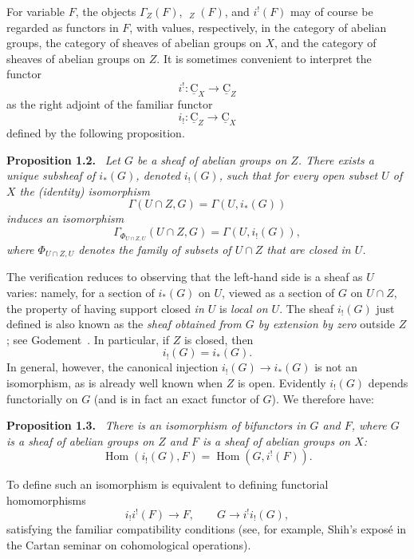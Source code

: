 \documentclass[11pt,a4paper,oneside]{book}
\providecommand{\srcpage}[1]{%
  \marginpar{\raggedright\scriptsize\color{gray}Original French p.~#1}}
\providecommand{\uC}{\underline{\mathrm C}}
\providecommand{\uGamma}{\mathop{\underline{\Gamma}}\nolimits}
\newenvironment{sgastatement}[1]
  {\par\addvspace{0.8\baselineskip}\noindent\textbf{#1.}\ \itshape}
  {\par\addvspace{0.35\baselineskip}}
\theoremstyle{plain}
\theoremstyle{definition}
\theoremstyle{remark}
\begin{document}
For variable $F$, the objects $\Gamma_Z(F)$, $\uGamma_Z(F)$, and
$i^!(F)$ may of course be regarded as functors in $F$, with values,
respectively, in the category of abelian groups, the category of sheaves
of abelian groups on $X$, and the category of sheaves of abelian groups
on $Z$.  It is sometimes convenient to interpret the functor
\[
  i^!: \uC_X\longrightarrow\uC_Z
\]
as the right adjoint of the familiar functor
\[
  i_!: \uC_Z\longrightarrow\uC_X
\]
defined by the following proposition.

\srcpage{9}
\begin{sgastatement}{Proposition 1.2}
Let $G$ be a sheaf of abelian groups on $Z$.  There exists a unique
subsheaf of $i_*(G)$, denoted $i_!(G)$, such that for every open subset
$U$ of $X$ the (identity) isomorphism
\[
  \Gamma(U\cap Z,G)=\Gamma(U,i_*(G))
\]
induces an isomorphism
\[
  \Gamma_{\Phi_{U\cap Z,U}}(U\cap Z,G)=\Gamma(U,i_!(G)),
\]
where $\Phi_{U\cap Z,U}$ denotes the family of subsets of $U\cap Z$
that are closed in $U$.
\end{sgastatement}

The verification reduces to observing that the left-hand side is a
sheaf as $U$ varies: namely, for a section of $i_*(G)$ on $U$, viewed
as a section of $G$ on $U\cap Z$, the property of having support closed
\emph{in $U$} is \emph{local on $U$}.  The sheaf $i_!(G)$ just defined
is also known as the \emph{sheaf obtained from $G$ by extension by zero}
outside $Z$; see Godement~\cite{Godement}.  In particular, if $Z$ is
closed, then
\begin{equation}
  i_!(G)=i_*(G).
  \tag{9}\label{eq:I.9}
\end{equation}
In general, however, the canonical injection
$i_!(G)\to i_*(G)$ is not an isomorphism, as is already well known when
$Z$ is open.  Evidently $i_!(G)$ depends functorially on $G$ (and is in
fact an exact functor of $G$).  We therefore have:

\begin{sgastatement}{Proposition 1.3}
There is an isomorphism of bifunctors in $G$ and $F$, where $G$ is a
sheaf of abelian groups on $Z$ and $F$ is a sheaf of abelian groups on
$X$:
\begin{equation}
  \operatorname{Hom}(i_!(G),F)
  =\operatorname{Hom}(G,i^!(F)).
  \tag{10}\label{eq:I.10}
\end{equation}
\end{sgastatement}

To define such an isomorphism is equivalent to defining functorial
homomorphisms
\[
  i_!i^!(F)\longrightarrow F,
  \qquad
  G\longrightarrow i^!i_!(G),
\]
satisfying the familiar compatibility conditions (see, for example,
Shih's expos\'e in the Cartan seminar on cohomological operations).
\end{document}
